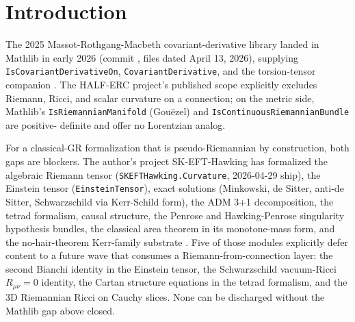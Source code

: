 \documentclass[twocolumn]{revtex4-2}
\begin{document}
\section{Introduction}\label{sec:intro}

The 2025 Massot-Rothgang-Macbeth covariant-derivative library landed
in Mathlib in early 2026 (commit \texttt{\mathlibrev}, files dated
April 13, 2026), supplying \texttt{IsCovariantDerivativeOn},
\texttt{CovariantDerivative}, and the torsion-tensor companion
\cite{MassotRothgangMacbeth2025}. The HALF-ERC project's published
scope explicitly excludes Riemann, Ricci, and scalar curvature on a
connection; on the metric side, Mathlib's \texttt{IsRiemannianManifold}
(Gou\"ezel) and \texttt{IsContinuousRiemannianBundle} are positive-
definite and offer no Lorentzian analog.

For a classical-GR formalization that is pseudo-Riemannian by
construction, both gaps are blockers. The author's project
SK-EFT-Hawking has formalized the algebraic Riemann tensor
(\texttt{SKEFTHawking.Curvature}, 2026-04-29 ship), the Einstein
tensor (\texttt{EinsteinTensor}), exact solutions (Minkowski, de
Sitter, anti-de Sitter, Schwarzschild via Kerr-Schild form), the ADM
3+1 decomposition, the tetrad formalism, causal structure, the
Penrose and Hawking-Penrose singularity hypothesis bundles, the
classical area theorem in its monotone-mass form, and the
no-hair-theorem Kerr-family substrate
\cite{Roehm2026Wave6f, Roehm2026Wave6g}. Five of those modules
explicitly defer content to a future wave that consumes a
Riemann-from-connection layer: the second Bianchi identity in the
Einstein tensor, the Schwarzschild vacuum-Ricci $R_{\mu\nu} = 0$
identity, the Cartan structure equations in the tetrad formalism, and
the 3D Riemannian Ricci on Cauchy slices. None can be discharged
without the Mathlib gap above closed.
\end{document}
